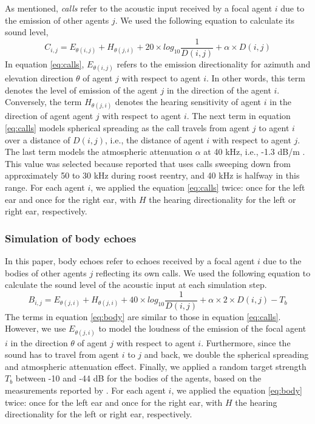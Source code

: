 \documentclass[a4paper, 11pt]{article}
\newcommand{\direction}{\theta}
\newcommand{\attenuation}{\alpha}
\newcommand{\emission}{E}
\newcommand{\hearing}{H}
\newcommand{\distance}{D}
\newcommand{\targetstrength}{T}
\newcommand{\wrt}[2]{#1,#2}
\newcommand{\wrtt}[2]{agent #1 with respect to agent #2}
\begin{document}
As mentioned, \emph{calls} refer to the acoustic input received by a focal agent $i$ due to the emission of other agents $j$. We used the following equation to calculate its sound level,
%
\begin{equation}
C_{\wrt{i}{j}} = \emission_{\direction(\wrt{i}{j})} + \hearing_{\direction(\wrt{j}{i})} + 20 \times log_{10}\frac{1}{\distance(i,j)} + \alpha \times \distance(i,j)
\label{eq:calls}
\end{equation}
%
In equation \ref{eq:calls}, $\emission_{\direction(i,j)}$ refers to the emission directionality for azimuth and elevation direction $\direction$ of \wrtt{$j$}{$i$}. In other words, this term denotes the level of emission of the agent $j$ in the direction of the agent $i$. Conversely, the term $\hearing_{\direction(\wrt{j}{i})}$ denotes the hearing sensitivity of agent $i$ in the direction of agent \wrtt{$j$}{$i$}. The next term in equation \ref{eq:calls} models spherical spreading as the call travels from agent $j$ to agent $i$ over a distance of $\distance(i,j)$, i.e., the distance of \wrtt{$i$}{$j$}. The last term models the atmospheric attenuation $\attenuation$ at 40 kHz, i.e., -1.3 dB/m \citep[Based on ISO 9613-1][]{Rietdijk2024,Stilz2012}. This value was selected because \citet{Kloepper2018} reported that  uses calls sweeping down from approximately 50 to 30 kHz during roost reentry, and 40 kHz is halfway in this range. For each agent $i$, we applied the equation \ref{eq:calls} twice: once for the left ear and once for the right ear, with $\hearing$ the hearing directionality for the left or right ear, respectively.

\subsubsection{Simulation of body echoes}

In this paper, body echoes refer to echoes received by a focal agent $i$ due to the bodies of other agents $j$ reflecting its own calls. We used the following equation to calculate the sound level of the acoustic input at each simulation step.
%
\begin{equation}
B_{i,j} = \emission_{\direction(\wrt{j}{i})} + \hearing_{\direction(\wrt{j}{i})} + 40 \times log_{10}\frac{1}{\distance(i,j)} + \alpha \times 2 \times \distance(i,j) - \targetstrength_b
\label{eq:body}
\end{equation}
%
The terms in equation \ref{eq:body} are similar to those in equation \ref{eq:calls}. However, we use $\emission_{\direction(\wrt{j}{i})}$ to model the loudness of the emission of the focal agent $i$ in the direction $\direction$ of \wrtt{$j$}{$i$}. Furthermore, since the sound has to travel from agent $i$ to $j$ and back, we double the spherical spreading and atmospheric attenuation effect. Finally, we applied a random target strength $\targetstrength_b$ between -10 and -44 dB for the bodies of the agents, based on the measurements reported by \citet{Beleyur2019}. For each agent $i$, we applied the equation \ref{eq:body} twice: once for the left ear and once for the right ear, with $\hearing$ the hearing directionality for the left or right ear, respectively.
\end{document}
